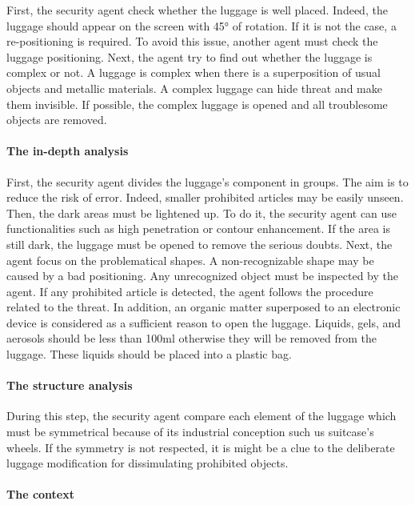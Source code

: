 First, the security agent check whether the luggage is well placed. Indeed, the luggage should appear on the screen with \ang{45} of rotation. If it is not the case, a re-positioning is required. To avoid this issue, another agent must check the luggage positioning.
Next, the agent try to find out whether the luggage is complex or not. A luggage is complex when there is a superposition of usual objects and metallic materials. A complex luggage can hide threat and make them invisible. If possible, the complex luggage is opened and all troublesome objects are removed.

\paragraph{The in-depth analysis}


First, the security agent divides the luggage's component in groups. The aim is to reduce the risk of error. Indeed, smaller prohibited articles may be easily unseen. Then, the dark areas must be lightened up. To do it, the security agent can use functionalities such as high penetration or contour enhancement. If the area is still dark, the luggage must be opened to remove the serious doubts.
Next, the agent focus on the problematical shapes. A non-recognizable shape may be caused by a bad positioning. Any unrecognized object must be inspected by the agent. If any prohibited article is detected, the agent follows the procedure related to the threat. In addition, an organic matter superposed to an electronic device is considered as a sufficient reason to open the luggage. Liquids, gels, and aerosols should be less than 100ml otherwise they will be removed from the luggage. These liquids should be placed into a plastic bag.

\paragraph{The structure analysis}


During this step, the security agent compare each element of the luggage which must be symmetrical because of its industrial conception such us suitcase's wheels. If the symmetry is not respected, it is might be a clue to the deliberate luggage modification for dissimulating prohibited objects.

\paragraph{The context}


